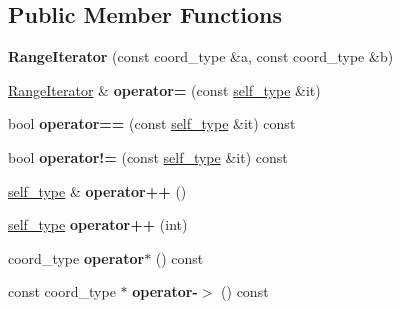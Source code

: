 \subsection*{Public Member Functions}
\begin{DoxyCompactItemize}
\item 
\hypertarget{class_d_o_1_1_range_iterator_ae6bedf04454e9beb6719f298360397f9}{{\bfseries Range\-Iterator} (const coord\-\_\-type \&a, const coord\-\_\-type \&b)}\label{class_d_o_1_1_range_iterator_ae6bedf04454e9beb6719f298360397f9}

\item 
\hypertarget{class_d_o_1_1_range_iterator_a1fd855adf73ce7fa606fe3fb25cb30f1}{\hyperlink{class_d_o_1_1_range_iterator}{Range\-Iterator} \& {\bfseries operator=} (const \hyperlink{class_d_o_1_1_range_iterator}{self\-\_\-type} \&it)}\label{class_d_o_1_1_range_iterator_a1fd855adf73ce7fa606fe3fb25cb30f1}

\item 
\hypertarget{class_d_o_1_1_range_iterator_a61a6dd6a1c1c7f9bbccd31da5fa254f8}{bool {\bfseries operator==} (const \hyperlink{class_d_o_1_1_range_iterator}{self\-\_\-type} \&it) const }\label{class_d_o_1_1_range_iterator_a61a6dd6a1c1c7f9bbccd31da5fa254f8}

\item 
\hypertarget{class_d_o_1_1_range_iterator_aa14a207f9b5edbfa2fd1c62bc7320b99}{bool {\bfseries operator!=} (const \hyperlink{class_d_o_1_1_range_iterator}{self\-\_\-type} \&it) const }\label{class_d_o_1_1_range_iterator_aa14a207f9b5edbfa2fd1c62bc7320b99}

\item 
\hypertarget{class_d_o_1_1_range_iterator_a68c6d6abdde9fef27d6a4f2904212559}{\hyperlink{class_d_o_1_1_range_iterator}{self\-\_\-type} \& {\bfseries operator++} ()}\label{class_d_o_1_1_range_iterator_a68c6d6abdde9fef27d6a4f2904212559}

\item 
\hypertarget{class_d_o_1_1_range_iterator_a39f7c37604fd9845ff487b36b6f88602}{\hyperlink{class_d_o_1_1_range_iterator}{self\-\_\-type} {\bfseries operator++} (int)}\label{class_d_o_1_1_range_iterator_a39f7c37604fd9845ff487b36b6f88602}

\item 
\hypertarget{class_d_o_1_1_range_iterator_ab8d2f6e21f55ecfb383d1d4fd2103b1e}{coord\-\_\-type {\bfseries operator$\ast$} () const }\label{class_d_o_1_1_range_iterator_ab8d2f6e21f55ecfb383d1d4fd2103b1e}

\item 
\hypertarget{class_d_o_1_1_range_iterator_a40f822f265cedaeb23c3d015e6629253}{const coord\-\_\-type $\ast$ {\bfseries operator-\/$>$} () const }\label{class_d_o_1_1_range_iterator_a40f822f265cedaeb23c3d015e6629253}

\end{DoxyCompactItemize}
